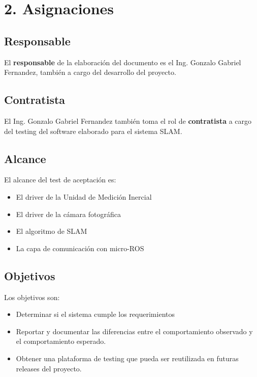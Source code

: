 \documentclass[
11pt, %
codirector, %
]{simple_charter}
\begin{document}
\section{2. Asignaciones}
\label{sec:2-asignaciones}

\subsection{Responsable}
\label{ssec:responsable}

El \textbf{responsable} de la elaboración del documento es el Ing. Gonzalo Gabriel Fernandez,
también a cargo del desarrollo del proyecto.

\subsection{Contratista}
\label{ssec:contratista}

El Ing. Gonzalo Gabriel Fernandez también toma el rol de \textbf{contratista} a cargo del testing
del software elaborado para el sistema SLAM.

\subsection{Alcance}
\label{ssec:alcance}

El alcance del test de aceptación es:

\begin{itemize}
	\item El driver de la Unidad de Medición Inercial
	\item El driver de la cámara fotográfica
	\item El algoritmo de SLAM
	\item La capa de comunicación con micro-ROS
\end{itemize}

\subsection{Objetivos}
\label{ssec:objetivos}

Los objetivos son:

\begin{itemize}
	\item Determinar si el sistema cumple los requerimientos
	\item Reportar y documentar las diferencias entre el comportamiento observado y el
	comportamiento esperado.
	\item Obtener una plataforma de testing que pueda ser reutilizada en futuras releases del
	proyecto.
\end{itemize}
\end{document}
